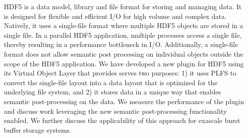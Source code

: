 HDF5 is a data model, library and file format for storing and managing data. It is designed for flexible and efficient I/O for high volume and complex data. Natively, it uses a single-file format where multiple HDF5 objects are stored in a single file. In a parallel HDF5 application, multiple processes access a single file, thereby resulting in a performance bottleneck in I/O. Additionally, a single-file format does not allow semantic post processing on individual objects outside the scope of the HDF5 application. We have developed a new plugin for HDF5 using its Virtual Object Layer that provides serves two purposes: 1) it uses PLFS to convert the single-file layout into a data layout that is optimized for the underlying file system, and 2) it stores data in a unique way that enables semantic post-processing on the data. We measure the performance of the plugin and discuss work leveraging the new semantic post-processing functionality enabled.  We further discuss the applicability of this approach for exascale burst buffer storage systems.
